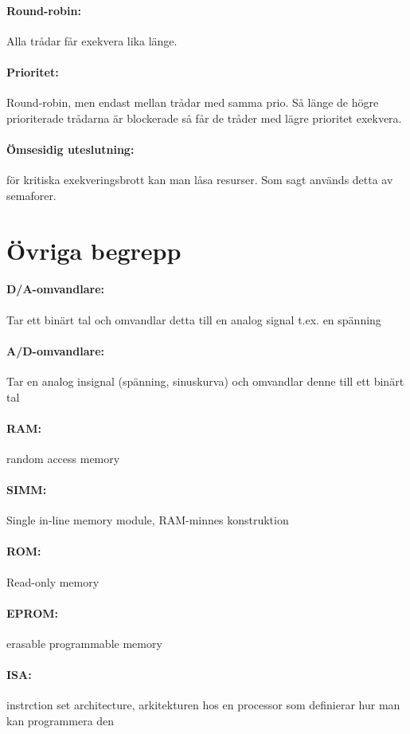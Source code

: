 \documentclass[a4paper]{article}
\begin{document}
\paragraph{Round-robin:} Alla trådar får exekvera lika länge.
\paragraph{Prioritet:} Round-robin, men endast mellan trådar med samma prio. Så länge de högre prioriterade trådarna är blockerade så får de tråder med lägre prioritet exekvera.
\paragraph{Ömsesidig uteslutning:} för kritiska exekveringsbrott kan man låsa resurser. Som sagt används detta av semaforer.
\section{Övriga begrepp}
\paragraph{D/A-omvandlare:} Tar ett binärt tal och omvandlar detta till en analog signal t.ex. en spänning
\paragraph{A/D-omvandlare:} Tar en analog insignal (spänning, sinuskurva) och omvandlar denne till ett binärt tal
\paragraph{RAM:} random access memory
\paragraph{SIMM:} Single in-line memory module, RAM-minnes konstruktion
\paragraph{ROM:} Read-only memory
\paragraph{EPROM:} erasable programmable memory
\paragraph{ISA:} instrction set architecture, arkitekturen hos en processor som definierar hur man kan programmera den
\end{document}
